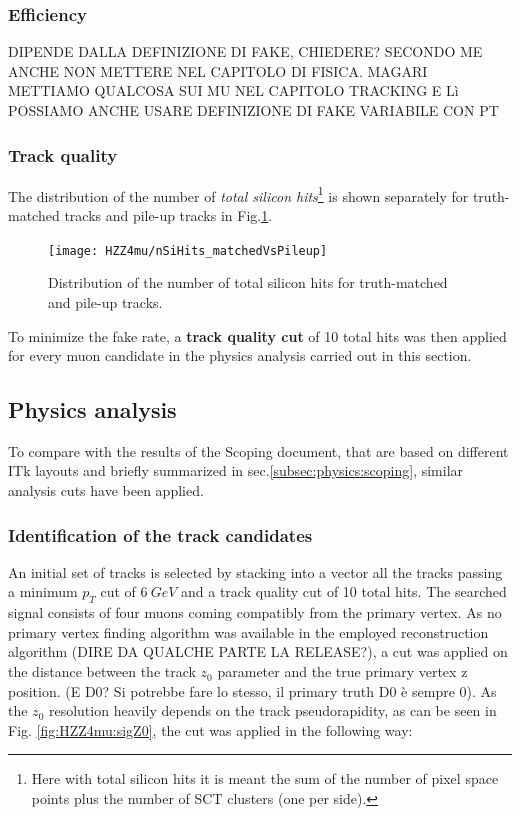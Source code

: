 \documentclass[a4paper,twoside,12pt]{article}
\begin{document}
\subsubsection*{Efficiency}
DIPENDE DALLA DEFINIZIONE DI FAKE, CHIEDERE? SECONDO ME ANCHE NON METTERE NEL CAPITOLO DI FISICA. MAGARI METTIAMO 
QUALCOSA SUI MU NEL CAPITOLO TRACKING E Lì POSSIAMO ANCHE USARE DEFINIZIONE DI FAKE VARIABILE CON PT

\subsubsection*{Track quality}
The distribution of the number of \textit{total silicon hits}\footnote{Here with total silicon hits it is meant the sum of the number
of pixel space points plus the number of SCT clusters (one per side).} is shown separately for truth-matched tracks and pile-up tracks in
Fig.\ref{fig:HZZ4mu:trackQuality}.

\begin{figure}
\centering
\texttt{[image: HZZ4mu/nSiHits\_matchedVsPileup]}
\caption{Distribution of the number of total silicon hits for truth-matched and pile-up tracks.}
\label{fig:HZZ4mu:trackQuality}
\end{figure}

To minimize the fake rate, a \textbf{track quality cut} of 10 total hits was then applied for every muon candidate in the physics analysis carried
out in this section.

\subsection{Physics analysis}\label{sec:physics:analysis}
To compare with the results of the Scoping document, that 
are based on different ITk layouts and briefly summarized in sec.\ref{subsec:physics:scoping}, 
similar analysis cuts have been applied. \\

\subsubsection{Identification of the track candidates}
An initial set of tracks is selected by stacking into a vector all the tracks passing a minimum
$p_{T}$ cut of $6\ GeV$ and a track quality cut of 10 total hits. The searched signal consists
of four muons coming compatibly from the primary vertex. As no primary vertex finding algorithm
was available in the employed reconstruction algorithm (DIRE DA QUALCHE PARTE LA RELEASE?),
a cut was applied on the distance between the track $z_0$ parameter and the true primary vertex
z position. (E D0? Si potrebbe fare lo stesso, il primary truth D0 è sempre 0). As the 
$z_0$ resolution heavily depends on the track pseudorapidity, as can be seen in Fig.
\ref{fig:HZZ4mu:sigZ0}, the cut was applied in the following way:
\end{document}
